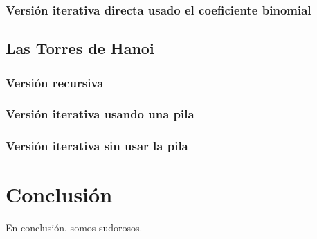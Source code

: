 \documentclass[a4paper,12pt]{article} %
\begin{document}
\subsubsection{Versión iterativa directa usado el coeficiente binomial}

\subsection{Las Torres de Hanoi}

\subsubsection{Versión recursiva}

\subsubsection{Versión iterativa usando una pila}

\subsubsection{Versión iterativa sin usar la pila}

\section{Conclusión}
En conclusión, somos sudorosos.
\end{document}
